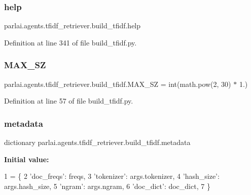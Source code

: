 \subsubsection{\texorpdfstring{help}{help}}
{\footnotesize\ttfamily parlai.\+agents.\+tfidf\+\_\+retriever.\+build\+\_\+tfidf.\+help}



Definition at line 341 of file build\+\_\+tfidf.\+py.

\mbox{\label{namespaceparlai_1_1agents_1_1tfidf__retriever_1_1build__tfidf_ae004cad36f1e393ce6c158058a526eeb}} 
\subsubsection{\texorpdfstring{M\+A\+X\+\_\+\+SZ}{MAX\_SZ}}
{\footnotesize\ttfamily parlai.\+agents.\+tfidf\+\_\+retriever.\+build\+\_\+tfidf.\+M\+A\+X\+\_\+\+SZ = int(math.\+pow(2, 30) $\ast$ 1.)}



Definition at line 57 of file build\+\_\+tfidf.\+py.

\mbox{\label{namespaceparlai_1_1agents_1_1tfidf__retriever_1_1build__tfidf_a78c951c63ece0474919ceef5d15d7e5d}} 
\subsubsection{\texorpdfstring{metadata}{metadata}}
{\footnotesize\ttfamily dictionary parlai.\+agents.\+tfidf\+\_\+retriever.\+build\+\_\+tfidf.\+metadata}

{\bfseries Initial value\+:}
\begin{DoxyCode}
1 =  \{
2         \textcolor{stringliteral}{'doc\_freqs'}: freqs,
3         \textcolor{stringliteral}{'tokenizer'}: args.tokenizer,
4         \textcolor{stringliteral}{'hash\_size'}: args.hash\_size,
5         \textcolor{stringliteral}{'ngram'}: args.ngram,
6         \textcolor{stringliteral}{'doc\_dict'}: doc\_dict,
7     \}
\end{DoxyCode}



